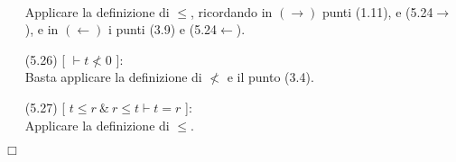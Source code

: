 \begin{enumerate}
	\vspace{.2cm}
	\\Applicare la definizione di $\leq$, ricordando in $(\rightarrow)$ punti (1.11), e (5.24$\rightarrow$), e in $(\leftarrow)$ i punti (3.9) e (5.24$\leftarrow$).
	\vspace{.5cm}
	\item[(5.26)] [ $\vdash t\not< 0$ ]:
	\vspace{.2cm}
	\\Basta applicare la definizione di $\not<$ e il punto (3.4).
	\vspace{.5cm}
	\item[(5.27)] [ $t\leq r\ \mbox{\&}\ r\leq t\vdash t=r$ ]:
	\vspace{.2cm}
	\\Applicare la definizione di $\leq$.
\end{enumerate}
$\Box$\\

